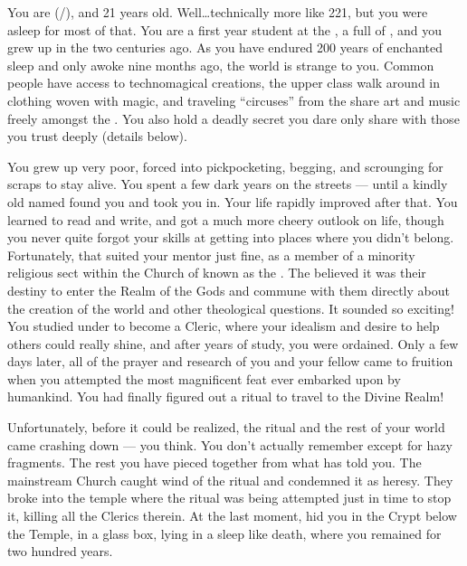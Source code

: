 \documentclass[char]{GL2020}
\begin{document}
\name{\cDisney{}}

You are \cDisney{\full} (\cDisney{\they}/\cDisney{\them}), and 21 years old. Well\ldots{}technically more like 221, but you were asleep for most of that. You are a first year student at the \pSchool{}, a full \cDisney{\cleric} of \cFarmGod{}, and you grew up in the \pFarm{} two centuries ago. As you have endured 200 years of enchanted sleep and only awoke nine months ago, the world is strange to you. Common people have access to technomagical creations, the upper class walk around in clothing woven with magic, and traveling ``circuses'' from the \pTech{} share art and music freely amongst the \pFarmers{}. You also hold a deadly secret you dare only share with those you trust deeply (details below). 

You grew up very poor, forced into pickpocketing, begging, and scrounging for scraps to stay alive. You spent a few dark years on the streets — until a kindly old \cDisneyMentor{\cleric} named \cDisneyMentor{} found you and took you in. Your life rapidly improved after that. You learned to read and write, and got a much more cheery outlook on life, though you never quite forgot your skills at getting into places where you didn't belong. Fortunately, that suited your mentor just fine, as \cDisneyMentor{\they} \cDisneyMentor{\were} a member of a minority religious sect within the Church of \cFarmGod{} known as the \cDisneySect{}. The \cDisneySect{} believed it was their destiny to enter the Realm of the Gods and commune with them directly about the creation of the world and other theological questions. It sounded so exciting! You studied under \cDisneyMentor{} to become a Cleric, where your idealism and desire to help others could really shine, and after years of study, you were ordained. Only a few days later, all of the prayer and research of you and your fellow \cDisneySect{} came to fruition when you attempted the most magnificent feat ever embarked upon by humankind. You had finally figured out a ritual to travel to the Divine Realm!

Unfortunately, before it could be realized, the ritual and the rest of your world came crashing down — you think. You don't actually remember except for hazy fragments. The rest you have pieced together from what \cWildCard{} has told you. The mainstream Church caught wind of the ritual and condemned it as heresy. They broke into the temple where the ritual was being attempted just in time to stop it, killing all the Clerics therein. At the last moment, \cDisneyMentor{} hid you in the Crypt below the Temple, in a glass box, lying in a sleep like death, where you remained for two hundred years. 
\end{document}
